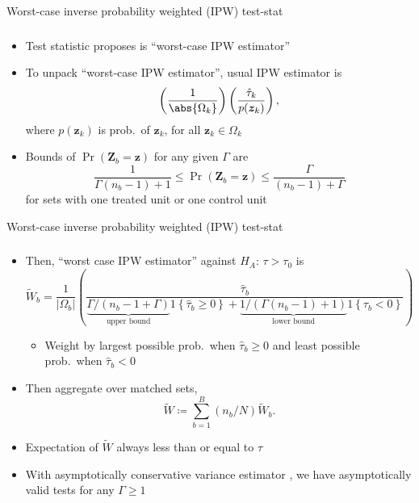 \documentclass[table, xcolor = {dvipsnames}, 9pt]{beamer}
\theoremstyle{plain}
\begin{document}
\begin{frame}[t]{Worst-case inverse probability weighted (IPW) test-stat}
\frametitle{} 
\vfill
\begin{itemize} \vfill
\item Test statistic \citet{fogarty2023} proposes is ``worst-case IPW estimator'' \vfill
\item To unpack ``worst-case IPW estimator'', usual IPW estimator is
\begin{align} \label{eq: strat IPW}
\left(\dfrac{1}{\abs{\Omega_k}}\right) \left(\dfrac{\hat{\tau}_k}{p(\bm{z}_k)}\right),
\end{align}
where $p(\bm{z}_k)$ is prob.~of $\bm{z}_k$, for all $\bm{z}_k \in \Omega_k$ \vfill
\item Bounds of $\Pr\left(\bm{Z}_b = \bm{z}\right)$ for any given $\Gamma$ are  \vfill
\begin{equation*}
\dfrac{1}{\Gamma(n_b - 1) + 1} \leq \Pr(\bm{Z}_b = \bm{z}) \leq \dfrac{\Gamma}{(n_b - 1) + \Gamma}
\end{equation*} \vfill
for sets with one treated unit or one control unit
\vfill
\end{itemize}  
\vfill
\end{frame}
\begin{frame}[t]{Worst-case inverse probability weighted (IPW) test-stat}
\frametitle{} 
\vfill
\begin{itemize} \vfill
\item Then, ``worst case IPW estimator'' against $H_A: \, \tau > \tau_0$ is \vfill
\small
\begin{equation*}
\widetilde{W}_b = \dfrac{1}{\left\lvert \Omega_b \right \rvert}\left(\dfrac{\hat{\tau}_b}{\underbrace{\Gamma / \left(n_b - 1 + \Gamma\right)}_{\text{upper bound}} 1\left\{\hat{\tau}_b \geq 0\right\} + \underbrace{1 / \left(\Gamma(n_b - 1) + 1\right)}_{\text{lower bound}}1\left\{\tau_b < 0\right\}}\right)
\end{equation*} \normalsize \vfill
\normalsize
\begin{itemize} \vfill
\item Weight by largest possible prob.~when $\hat{\tau}_b \geq 0$ and least possible prob.~when $\hat{\tau}_b < 0$ \vfill
\end{itemize} \vfill
\item Then aggregate over matched sets, \vfill
\begin{equation*} 
\widetilde{W} \coloneqq \sum \limits_{b = 1}^B (n_b/N) \widetilde{W}_b.
\end{equation*}
\item Expectation of $\widetilde{W}$ always less than or equal to $\tau$ \vfill
\item With asymptotically conservative variance estimator \citep{fogarty2018,fogarty2023}, we have asymptotically valid tests for any $\Gamma \geq 1$ \vfill
\end{itemize}  
\vfill
\end{frame}
\end{document}
